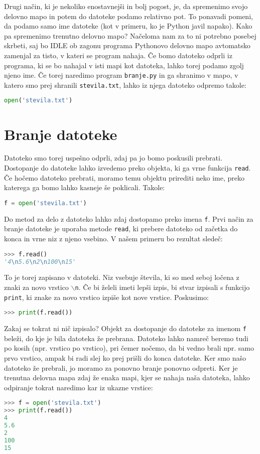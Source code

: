 Drugi način, ki je nekoliko enostavnejši in bolj pogost, je, da spremenimo svojo delovno mapo in potem do datoteke podamo relativno pot. To ponavadi pomeni, da podamo samo ime datoteke (kot v primeru, ko je Python javil napako). Kako pa spremenimo trenutno delovno mapo? Načeloma nam za to ni potrebno posebej skrbeti, saj bo IDLE ob zagonu programa Pythonovo delovno mapo avtomatsko zamenjal za tisto, v kateri se program nahaja. Če bomo datoteko odprli iz programa, ki se bo nahajal v isti mapi kot datoteka, lahko torej podamo zgolj njeno ime. Če torej naredimo program \texttt{branje.py} in ga shranimo v mapo, v katero smo prej shranili \texttt{stevila.txt}, lahko iz njega datoteko odpremo takole:
\begin{lstlisting}[language=Python, showstringspaces=false]
open('stevila.txt')
\end{lstlisting}

\section{Branje datoteke}
Datoteko smo torej uspešno odprli, zdaj pa jo bomo poskusili prebrati. Dostopanje do datoteke lahko izvedemo preko objekta, ki ga vrne funkcija \texttt{read}. Če hočemo datoteko prebrati, moramo temu objektu prirediti neko ime, preko katerega ga bomo lahko kasneje še poklicali. Takole:
\begin{lstlisting}[language=Python, showstringspaces=false]
f = open('stevila.txt')
\end{lstlisting}
Do metod za delo z datoteko lahko zdaj dostopamo preko imena \texttt{f}. Prvi način za branje datoteke je uporaba metode \texttt{read}, ki prebere datoteko od začetka do konca in vrne niz z njeno vsebino. V našem primeru bo rezultat sledeč:
\begin{lstlisting}[language=Python, showstringspaces=false]
>>> f.read()
'4\n5.6\n2\n100\n15'
\end{lstlisting}
To je torej zapisano v datoteki. Niz vsebuje števila, ki so med seboj ločena z znaki za novo vrstico \texttt{$\backslash$n}. Če bi želeli imeti lepši izpis, bi stvar izpisali s funkcijo \texttt{print}, ki znake za novo vrstico izpiše kot nove vrstice. Poskusimo:
\begin{lstlisting}[language=Python, showstringspaces=false]
>>> print(f.read())

\end{lstlisting}
Zakaj se tokrat ni nič izpisalo? Objekt za dostopanje do datoteke za imenom \texttt{f} beleži, do kje je bila datoteka že prebrana. Datoteko lahko namreč beremo tudi po kosih (npr. vrstico po vrstico), pri čemer nočemo, da bi vedno brali npr. samo prvo vrstico, ampak bi radi slej ko prej prišli do konca datoteke. Ker smo našo datoteko že prebrali, jo moramo za ponovno branje ponovno odpreti. Ker je trenutna delovna mapa zdaj že enaka mapi, kjer se nahaja naša datoteka, lahko odpiranje tokrat naredimo kar iz ukazne vrstice:
\begin{lstlisting}[language=Python, showstringspaces=false]
>>> f = open('stevila.txt')
>>> print(f.read())
4
5.6
2
100
15
\end{lstlisting}

